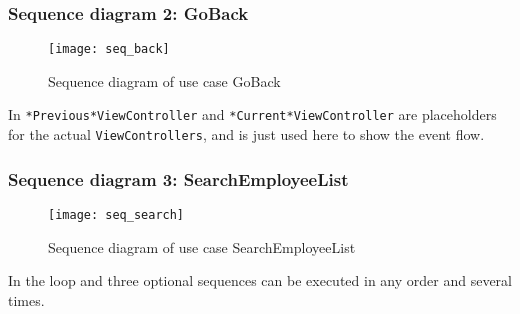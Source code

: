 \subsubsection{Sequence diagram 2: GoBack}

\begin{figure}[H]
    \centerline{\texttt{[image: seq\_back]}}
    \caption{Sequence diagram of use case GoBack }
    \label{fig:uc2}
\end{figure}

In  \texttt{*Previous*ViewController} and \texttt{*Current*ViewController} are placeholders for the actual \texttt{ViewControllers}, and is just used here to show the event flow.

\newpage
\subsubsection{Sequence diagram 3: SearchEmployeeList}

\begin{figure}[H]
    \centerline{\texttt{[image: seq\_search]}}
    \caption{Sequence diagram of use case SearchEmployeeList}
    \label{fig:uc3}
\end{figure}

In  the loop and three optional sequences can be executed in any order and several times.
